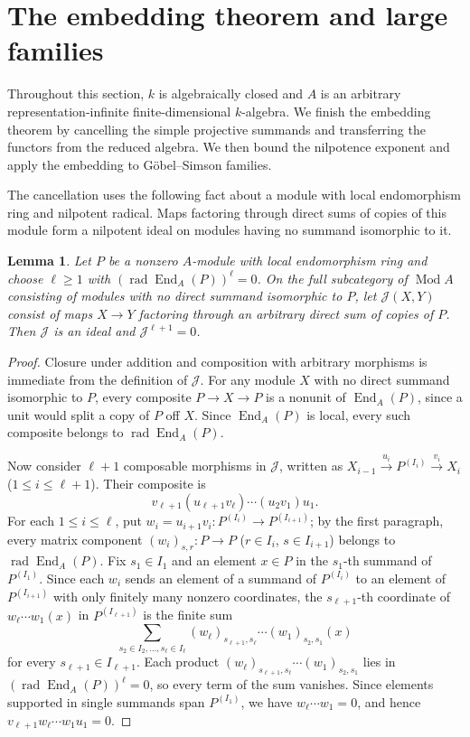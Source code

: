 \documentclass[a4paper,reqno,10pt]{amsart}
\newtheorem{lemma}[theorem]{Lemma}
\theoremstyle{definition}
\DeclareMathOperator{\End}{End}
\DeclareMathOperator{\rad}{rad}
\DeclareMathOperator{\Mod}{Mod}
\numberwithin{equation}{section}
\begin{document}
\section{The embedding theorem and large families}
\label{sec:completion}
Throughout this section, $k$ is algebraically closed and $A$ is an
arbitrary representation-infinite finite-dimensional $k$-algebra.
We finish the embedding theorem by cancelling the simple projective
summands and transferring the functors from the reduced algebra.
We then bound the nilpotence exponent and apply the embedding to
G\"obel--Simson families.

The cancellation uses the following fact about a module with local
endomorphism ring and nilpotent radical. Maps factoring through direct sums of copies of this module form a
nilpotent ideal on modules having no summand isomorphic to it.
\begin{lemma}\label{lem:fixed-summand}
Let $P$ be a nonzero $A$-module with local endomorphism ring and choose
$\ell\ge1$ with $(\rad\End_A(P))^\ell=0$.
On the full subcategory of $\Mod A$ consisting of modules with no direct
summand isomorphic to $P$, let $\mathcal J(X,Y)$ consist of maps
$X\to Y$ factoring through an arbitrary direct sum of copies of $P$.
Then $\mathcal J$ is an ideal and $\mathcal J^{\ell+1}=0$.
\end{lemma}
\begin{proof}
Closure under addition and composition with arbitrary morphisms is immediate
from the definition of $\mathcal J$. For any module $X$ with no direct summand isomorphic to $P$, every composite $P\to X\to P$ is a nonunit of
$\End_A(P)$, since a unit would split a copy of $P$ off $X$.
Since $\End_A(P)$ is local, every such composite belongs to $\rad\End_A(P)$.

Now consider $\ell+1$ composable morphisms in $\mathcal J$, written as
$X_{i-1}\xrightarrow{u_i}P^{(I_i)}\xrightarrow{v_i}X_i$ ($1\le i\le \ell+1$).
Their composite is
\[
 v_{\ell+1}(u_{\ell+1}v_\ell)\cdots(u_2v_1)u_1.
\]
For each $1\le i\le \ell$, put $w_i=u_{i+1}v_i:P^{(I_i)}\to P^{(I_{i+1})}$;
by the first paragraph, every matrix component
$(w_i)_{s,r}:P\to P$ ($r\in I_i$, $s\in I_{i+1}$) belongs to
$\rad\End_A(P)$. Fix $s_1\in I_1$ and an element $x\in P$ in the
$s_1$-th summand of $P^{(I_1)}$. Since each $w_i$ sends an element of a
summand of $P^{(I_i)}$ to an element of $P^{(I_{i+1})}$ with only finitely
many nonzero coordinates, the $s_{\ell+1}$-th coordinate of
$w_\ell\cdots w_1(x)$ in $P^{(I_{\ell+1})}$ is the finite sum
\[
 \sum_{s_2\in I_2,\ldots,s_\ell\in I_\ell}
 (w_\ell)_{s_{\ell+1},s_\ell}\cdots(w_1)_{s_2,s_1}(x)
\]
for every $s_{\ell+1}\in I_{\ell+1}$. Each product
$(w_\ell)_{s_{\ell+1},s_\ell}\cdots(w_1)_{s_2,s_1}$ lies in
$(\rad\End_A(P))^\ell=0$, so every term of the sum vanishes.
Since elements supported in single summands span $P^{(I_1)}$, we have
$w_\ell\cdots w_1=0$, and hence $v_{\ell+1}w_\ell\cdots w_1u_1=0$.
\end{proof}
\end{document}
